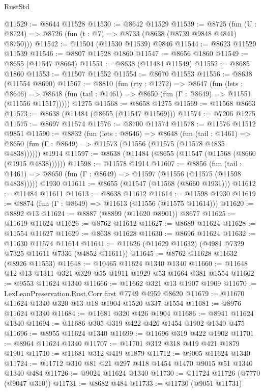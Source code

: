 \begin{lexlean}{RustStd}
\begin{coremodule}
@11529 := @8644 @11528
@11530 := @8642 @11529
@11539 := @8725 (fun (U : @8724) => @8726 (fun (t : @7) => @8733 (@8638 (@8739 @9848 @4841) @8750)))
@11542 := @11504 (@11530 @11539) @9846
@11544 := @8623 @11529 @11539
@11546 := @8807 @11528 @1860
@11547 := @8656 @1860
@11549 := @8655 (@11547 @8664)
@11551 := @8638 (@11484 @11549)
@11552 := @8685 @1860
@11553 := @11507 @11552
@11554 := @8670 @11553
@11556 := @8638 (@11554 @8690)
@11567 := @8810
    (fun (rty : @1272) =>
    @8647
      (fun (lets : @8646) =>
      @8648 (fun (tail : @1461) => @8650 (fun (Γ : @8649) => @11551 (@11556 @11517)))))
    @1275
@11568 := @8658 @1275
@11569 := @11568 @8663
@11573 := @8638 (@11484 (@8655 (@11547 @11569)))
@11574 := @7206 @1275
@11575 := @8697 @11574
@11576 := @8700 @11574
@11578 := @11576 @11512 @9851
@11590 := @8832
    (fun (lets : @8646) =>
    @8648
      (fun (tail : @1461) =>
      @8650 (fun (Γ : @8649) => @11573 (@11556 (@11575 (@11578 @4835 @4838))))))
    @1914
@11597 := @8638 (@11484 (@8655 (@11547 (@11568 (@8660 (@1915 @4838))))))
@11598 := @11578 @1914
@11607 := @8856
    (fun (tail : @1461) => @8650 (fun (Γ : @8649) => @11597 (@11556 (@11575 (@11598 @4838)))))
    @1930
@11611 := @8655 (@11547 (@11568 (@8660 @1931)))
@11612 := @11484 @11611
@11613 := @8638 @11612
@11614 := @11598 @1930
@11619 := @8874 (fun (Γ : @8649) => @11613 (@11556 (@11575 @11614)))
@11620 := @8892 @13
@11624 := @8887 (@8899 (@11620 @8901)) @8677
@11625 := @11619 @11624
@11626 := @8762 @11612
@11627 := @8689 @11624
@11628 := @11554 @11627
@11629 := @8638 @11628
@11630 := @8696 @11624
@11632 := @11630 @11574 @11614
@11641 := @11626 (@11629 @11632) (@4981 @7329 @7325 @11611 @7336 (@4852 @11611))
@11645 := @8762 @11628 @11632 (@8926 @11553)
@11648 := @10465 @11624 @1340 @1340
@11660 := @11648 @12 @13 @1311 @321 @329 @55 @1911 @1929 @53 @1664 @381 @1554
@11662 := @9553 @11624 @1340
@11666 := @11662 @321 @13 @1907 @1909
@11670 := LexLeanPreservation.Rust.Corr.first @7749 @4959 @8620
@11679 := @11670 @11624 @1340 @320 @13 @18 @1904 @1520 @337 @1554
@11681 := @8976 @11624 @1340
@11684 := @11681 @320 @426 @1904
@11686 := @8941 @11624 @1340
@11694 := @11686 @305 @319 @422 @426 @1454 @1902 @1340 @475
@11696 := @8955 @11624 @1340
@11699 := @11696 @319 @422 @1902
@11701 := @8964 @11624 @1340
@11707 := @11701 @312 @318 @419 @421 @1879 @1901
@11710 := @11681 @312 @419 @1879
@11712 := @9005 @11624 @1340
@11724 := @11712 @310 @81 @21 @297 @418 @1454 @1470 @9015 @51 @1340 @1340 @484
@11726 := @9024 @11624 @1340
@11730 := @11724 @11726 (@7770 (@9047 @310))
@11731 := @8682 @484
@11733 := @11730 (@9051 @11731)

\end{coremodule}
\end{lexlean}
